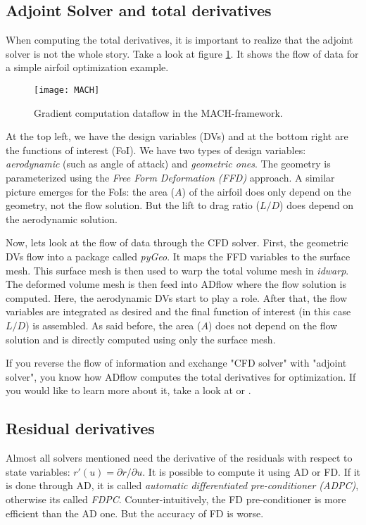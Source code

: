 \subsection{Adjoint Solver and total derivatives}
\label{subsec:adjoint}
When computing the total derivatives, it is important to realize that the
adjoint solver is not the whole story. Take a look at figure \ref{fig:MACH}. It
shows the flow of data for a simple airfoil optimization example.

\begin{figure}[H] \centering
    \texttt{[image: MACH]}
    \caption{Gradient computation dataflow in the MACH-framework. \cite{cm1}}
    \label{fig:MACH}
\end{figure}


\noindent At the top left, we have the design variables (DVs) and at the bottom
right are the functions of interest (FoI). We have two types of design
variables: \textit{aerodynamic} (such as angle of attack) and \textit{geometric
ones}. The geometry is parameterized using the \textit{Free Form Deformation
(FFD)} approach. A similar picture emerges for the FoIs: the area ($A$) of the
airfoil does only depend on the geometry, not the flow solution. But the lift
to drag ratio ($L/D$) does depend on the aerodynamic solution.

Now, lets look at the flow of data through the CFD solver. First, the
geometric DVs flow into a package called \textit{pyGeo}. It maps the FFD
variables to the surface mesh. This surface mesh is then used to warp the total
volume mesh in \textit{idwarp}. The deformed volume mesh is then feed into
ADflow where the flow solution is computed. Here, the aerodynamic DVs start to
play a role. After that, the flow variables are integrated as desired and the
final function of interest (in this case $L/D$) is assembled. As said before,
the area ($A$) does not depend on the flow solution and is directly computed
using only the surface mesh.

If you reverse the flow of information and exchange "CFD solver" with "adjoint
solver", you know how ADflow computes the total derivatives for optimization. If
you would like to learn more about it, take a look at \cite{cm1} or
\cite{mdobook}.




\subsection{Residual derivatives}
Almost all solvers mentioned need the derivative of the residuals with respect
to state variables: $r'(u) = \partial r / \partial u$. It is possible to
compute it using AD or FD. If it is done through AD, it is called
\textit{automatic differentiated pre-conditioner (ADPC)}, otherwise its called
\textit{FDPC}. Counter-intuitively, the FD pre-conditioner is more efficient
than the AD one. But the accuracy of FD is worse.

